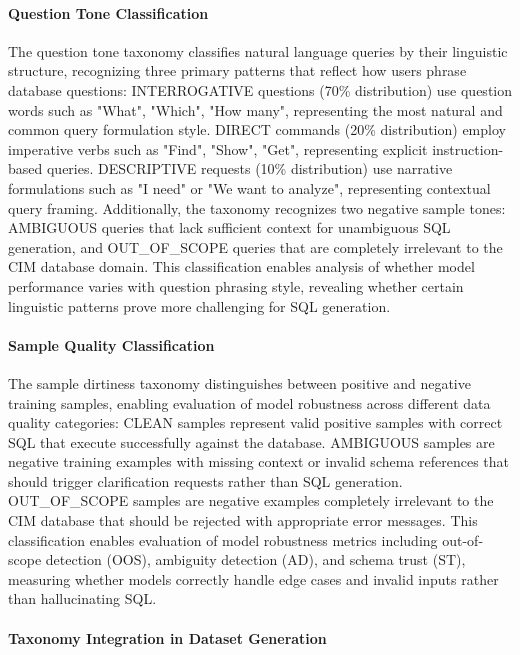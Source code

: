 \paragraph{Question Tone Classification}

The question tone taxonomy classifies natural language queries by their linguistic structure, recognizing three primary patterns that reflect how users phrase database questions: INTERROGATIVE questions (70\% distribution) use question words such as "What", "Which", "How many", representing the most natural and common query formulation style. DIRECT commands (20\% distribution) employ imperative verbs such as "Find", "Show", "Get", representing explicit instruction-based queries. DESCRIPTIVE requests (10\% distribution) use narrative formulations such as "I need" or "We want to analyze", representing contextual query framing. Additionally, the taxonomy recognizes two negative sample tones: AMBIGUOUS queries that lack sufficient context for unambiguous SQL generation, and OUT\_OF\_SCOPE queries that are completely irrelevant to the CIM database domain. This classification enables analysis of whether model performance varies with question phrasing style, revealing whether certain linguistic patterns prove more challenging for SQL generation.

\paragraph{Sample Quality Classification}

The sample dirtiness taxonomy distinguishes between positive and negative training samples, enabling evaluation of model robustness across different data quality categories: CLEAN samples represent valid positive samples with correct SQL that execute successfully against the database. AMBIGUOUS samples are negative training examples with missing context or invalid schema references that should trigger clarification requests rather than SQL generation. OUT\_OF\_SCOPE samples are negative examples completely irrelevant to the CIM database that should be rejected with appropriate error messages. This classification enables evaluation of model robustness metrics including out-of-scope detection (OOS), ambiguity detection (AD), and schema trust (ST), measuring whether models correctly handle edge cases and invalid inputs rather than hallucinating SQL.

\paragraph{Taxonomy Integration in Dataset Generation}

